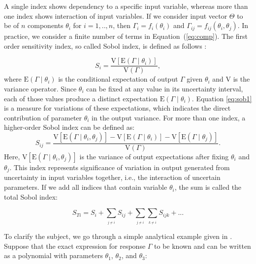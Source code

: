 A single index shows dependency to a specific input variable, whereas more than
one index shows interaction of input variables. If we consider input vector
$\Theta$ to be of $n$ components $\theta_{i}$ for $i=1,..,n$, then
$\Gamma_{i}=f_{i}(\theta_{i})$ and $\Gamma_{ij}=f_{ij}(\theta_{i},\theta_{j})$.
In practice, we consider a finite number of terms in Equation~(\ref{eq:comp}).
 The first order sensitivity index, so called Sobol index, is defined as follows
\cite{saltelli2007global}:

\begin{equation}
S_{i}=\frac{\mbox{V}[\mbox{E}(\Gamma\mid\theta_{i})]}{\mbox{V}(\Gamma)},
\label{eq:sob1}\end{equation} where $\mbox{E}(\Gamma\mid\theta_{i})$ is the
conditional
expectation of output $\Gamma$ given $\theta_{i}$ and $\mbox{V}$ is the variance
operator. Since $\theta_{i}$ can be fixed at any value in its uncertainty
interval, each of those values produce a distinct expectation
$\mbox{E}(\Gamma\mid\theta_{i})$. Equation \ref{eq:sob1} is a measure for
variations of these expectations, which indicates the direct contribution of
parameter $\theta_i$ in the output variance. For more than one index, a
higher-order Sobol index can be defined as:\begin{equation}
S_{ij}=\frac{\mbox{V}[\mbox{E}(\Gamma\mid\theta_{i},\theta_{j})]-\mbox{V}[\mbox{
E}(\Gamma\mid\theta_{i})]-\mbox{V}[\mbox{E}(\Gamma\mid\theta_{j})]}{\mbox{V}
(\Gamma)}.\label{eq:sob2}\end{equation} Here,
$\mbox{V}[\mbox{E}(\Gamma\mid\theta_{i},\theta_{j})]$ is the variance of output
expectations after fixing $\theta_{i}$ and $\theta_{j}$. This index represents
significance of variation in output generated from uncertainty in input 
variables together, i.e., the interaction of uncertain parameters. If we add all
indices that contain variable $\theta_{i}$, the sum is called the total Sobol
index:

\begin{equation}
S_{Ti}=S_{i}+\underset{_{j\neq i}}{\sum}S_{ij}+\underset{_{j\neq
i}}{\sum}\underset{_{k\neq i}}{\sum}S_{ijk}+...\label{eq:totSob}\end{equation}

To clarify the subject, we go through a simple analytical example given in
\cite{arwade2010variance}. Suppose that the exact expression for response
$\Gamma$ to be known and can be written as a polynomial with parameters
$\theta_1$, $\theta_2$, and $\theta_3$:
 
